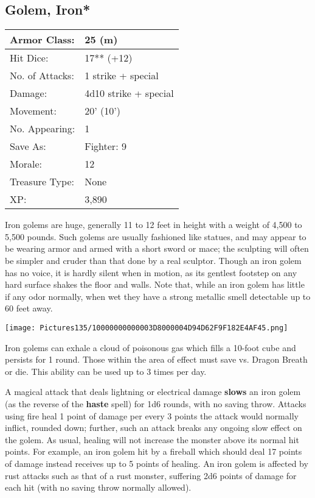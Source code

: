 \documentclass[a4paper,twoside,openany,10pt]{book}
\begin{document}
\begin{multicols}{2}
\subsection*{Golem, Iron*}\label{golem-iron}

\begin{tabularx}{0.48\textwidth}{@{}lX@{}}
Armor Class: & 25 (m) \\\hline
Hit Dice: & 17** (+12) \\\hline
No. of Attacks: & 1 strike + special \\\hline
Damage: & 4d10 strike + special \\\hline
Movement: & 20' (10') \\\hline
No. Appearing: & 1 \\\hline
Save As: & Fighter: 9 \\\hline
Morale: & 12 \\\hline
Treasure Type: & None \\\hline
XP: & 3,890 \\\hline
\end{tabularx}

Iron golems are huge, generally 11 to 12 feet in height with a weight of 4,500 to 5,500 pounds. Such golems are usually fashioned like statues, and may appear to be wearing armor and armed with a short sword or mace; the sculpting will often be simpler and cruder than that done by a real sculptor. Though an iron golem has no voice, it is hardly silent when in motion, as its gentlest footstep on any hard surface shakes the floor and walls. Note that, while an iron golem has little if any odor normally, when wet they have a strong metallic smell detectable up to 60 feet away.

\begin{center}
	\texttt{[image: Pictures135/10000000000003D8000004D94D62F9F182E4AF45.png]}
\end{center}

Iron golems can exhale a cloud of poisonous gas which fills a 10-foot cube and persists for 1 round. Those within the area of effect must save vs. Dragon Breath or die. This ability can be used up to 3 times per day.


A magical attack that deals lightning or electrical damage \textbf{slows} an iron golem (as the reverse of the \textbf{haste} spell) for 1d6 rounds, with no saving throw. Attacks using fire heal 1 point of damage per every 3 points the attack would normally inflict, rounded down; further, such an attack breaks any ongoing slow effect on the golem. As usual, healing will not increase the monster above its normal hit points. For example, an iron golem hit by a fireball which should deal 17 points of damage instead receives up to 5 points of healing. An iron golem is affected by rust attacks such as that of a rust monster, suffering 2d6 points of damage for each hit (with no saving throw normally allowed).


\end{multicols}
\end{document}
